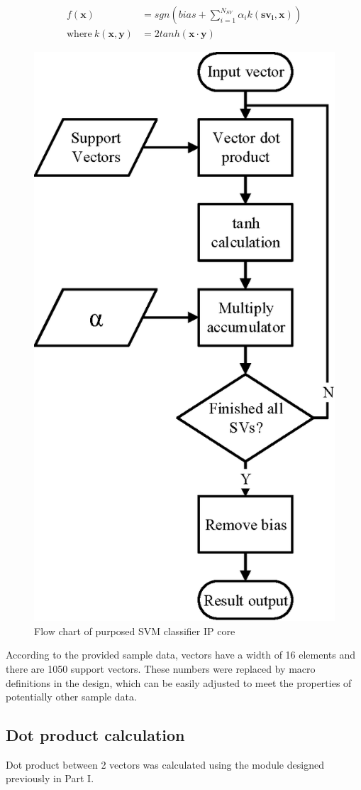 \documentclass[journal]{IEEEtran}
\begin{document}
\begin{align}
	f(\bm{x}) &= sgn \left( bias + \sum_{i=1}^{N_{SV}} \alpha_i k(\bm{{sv}_i}, \bm{x}) \right)
	\label{eq:cls}\\
	\text{where}~k(\bm{x}, \bm{y}) &= 2 tanh(\bm{x} \cdot \bm{y})
\end{align}

\begin{figure}[ht]
	\centering
	\includegraphics[width=0.6\columnwidth]{IP}
	\caption{Flow chart of purposed SVM classifier IP core}
	\label{fig:ip}
\end{figure}

According to the provided sample data, vectors have a width of 16 elements and there are 1050 support vectors. These numbers were replaced by macro definitions in the design, which can be easily adjusted to meet the properties of potentially other sample data.

\subsection{Dot product calculation}

Dot product between 2 vectors was calculated using the module designed previously in Part I.
\end{document}
